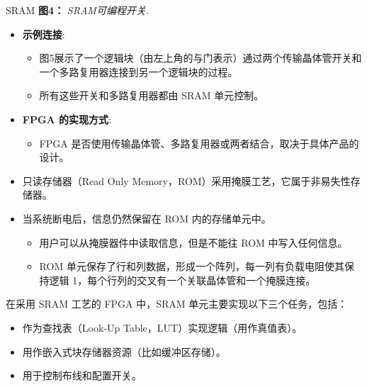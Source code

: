 \documentclass[
  ignorenonframetext,
  chinese,
]{beamer}
\providecommand{\tightlist}{%
  \setlength{\itemsep}{0pt}\setlength{\parskip}{0pt}}
\begin{document}
\begin{frame}
\begin{block}{SRAM}
\textbf{图4：} \emph{SRAM可编程开关.}

\begin{itemize}
\tightlist
\item
  \textbf{示例连接}:

  \begin{itemize}
  \tightlist
  \item
    图5展示了一个逻辑块（由左上角的与门表示）通过两个传输晶体管开关和一个多路复用器连接到另一个逻辑块的过程。
  \item
    所有这些开关和多路复用器都由 SRAM 单元控制。
  \end{itemize}
\item
  \textbf{FPGA 的实现方式}:

  \begin{itemize}
  \tightlist
  \item
    FPGA
    是否使用传输晶体管、多路复用器或两者结合，取决于具体产品的设计。
  \end{itemize}
\item
  只读存储器（Read Only
  Memory，ROM）采用掩膜工艺，它属于非易失性存储器。
\item
  当系统断电后，信息仍然保留在 ROM 内的存储单元中。

  \begin{itemize}
  \tightlist
  \item
    用户可以从掩膜器件中读取信息，但是不能往 ROM 中写入任何信息。
  \item
    ROM 单元保存了行和列数据，形成一个阵列，每一列有负载电阻使其保持逻辑
    1，每个行列的交叉有一个关联晶体管和一个掩膜连接。
  \end{itemize}
\end{itemize}
\end{block}
\end{frame}

\begin{frame}
在采用 SRAM 工艺的 FPGA 中，SRAM 单元主要实现以下三个任务，包括：

\begin{itemize}
\tightlist
\item
  作为查找表（Look-Up Table，LUT）实现逻辑（用作真值表）。
\item
  用作嵌入式块存储器资源（比如缓冲区存储）。
\item
  用于控制布线和配置开关。
\end{itemize}
\end{frame}
\end{document}
